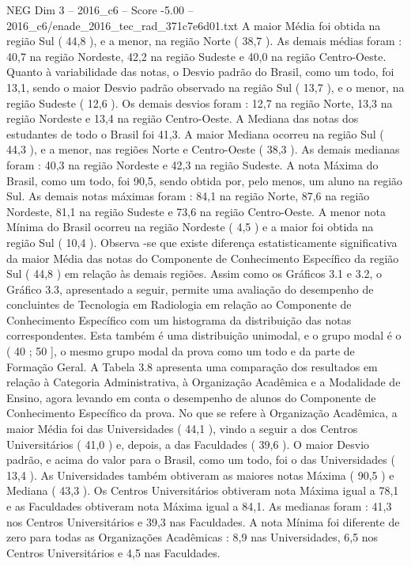 \begin{textsample}{NEG Dim 3 – 2016\_c6 – Score -5.00 – 2016\_c6/enade\_2016\_tec\_rad\_371c7e6d01.txt}
A maior Média foi obtida na região Sul ( 44,8 ), e a menor, na região Norte ( 38,7 ).
As demais médias foram : 40,7 na região Nordeste, 42,2 na região Sudeste e 40,0 na região Centro-Oeste.
Quanto à variabilidade das notas, o Desvio padrão do Brasil, como um todo, foi 13,1, sendo o maior Desvio padrão observado na região Sul ( 13,7 ), e o menor, na região Sudeste ( 12,6 ).
Os demais desvios foram : 12,7 na região Norte, 13,3 na região Nordeste e 13,4 na região Centro-Oeste.
A Mediana das notas dos estudantes de todo o Brasil foi 41,3.
A maior Mediana ocorreu na região Sul ( 44,3 ), e a menor, nas regiões Norte e Centro-Oeste ( 38,3 ).
As demais medianas foram : 40,3 na região Nordeste e 42,3 na região Sudeste.
A nota Máxima do Brasil, como um todo, foi 90,5, sendo obtida por, pelo menos, um aluno na região Sul.
As demais notas máximas foram : 84,1 na região Norte, 87,6 na região Nordeste, 81,1 na região Sudeste e 73,6 na região Centro-Oeste.
A menor nota Mínima do Brasil ocorreu na região Nordeste ( 4,5 ) e a maior foi obtida na região Sul ( 10,4 ).
Observa -se que existe diferença estatisticamente significativa da maior Média das notas do Componente de Conhecimento Específico da região Sul ( 44,8 ) em relação às demais regiões.
Assim como os Gráficos 3.1 e 3.2, o Gráfico 3.3, apresentado a seguir, permite uma avaliação do desempenho de concluintes de Tecnologia em Radiologia em relação ao Componente de Conhecimento Específico com um histograma da distribuição das notas correspondentes.
Esta também é uma distribuição unimodal, e o grupo modal é o ( 40 ; 50 ], o mesmo grupo modal da prova como um todo e da parte de Formação Geral.
A Tabela 3.8 apresenta uma comparação dos resultados em relação à Categoria Administrativa, à Organização Acadêmica e a Modalidade de Ensino, agora levando em conta o desempenho de alunos do Componente de Conhecimento Específico da prova.
No que se refere à Organização Acadêmica, a maior Média foi das Universidades ( 44,1 ), vindo a seguir a dos Centros Universitários ( 41,0 ) e, depois, a das Faculdades ( 39,6 ).
O maior Desvio padrão, e acima do valor para o Brasil, como um todo, foi o das Universidades ( 13,4 ).
As Universidades também obtiveram as maiores notas Máxima ( 90,5 ) e Mediana ( 43,3 ).
Os Centros Universitários obtiveram nota Máxima igual a 78,1 e as Faculdades obtiveram nota Máxima igual a 84,1.
As medianas foram : 41,3 nos Centros Universitários e 39,3 nas Faculdades.
A nota Mínima foi diferente de zero para todas as Organizações Acadêmicas : 8,9 nas Universidades, 6,5 nos Centros Universitários e 4,5 nas Faculdades.

\end{textsample}
